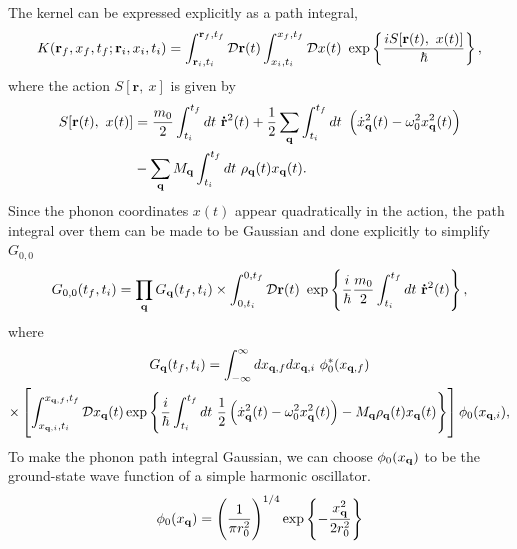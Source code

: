 The kernel can be expressed explicitly as a path integral,
\begin{equation}
    K(\vb{r}_f, x_f, t_f; \vb{r}_i, x_i, t_i) = \int_{\vb{r}_i, t_i}^{\vb{r}_f, t_f} \mathcal{D} \vb{r}(t) \int_{x_i, t_i}^{x_f, t_f} \mathcal{D}x(t)\ \exp\left\{{\frac{iS[\vb{r}(t),\ x(t)]}{\hbar}}\right\},
\label{eqn-2211-1}
\end{equation}
where the action $S[\mathbf{r},\ x]$ is given by
\begin{equation}
\begin{aligned}
    S[\mathbf{r}(t),\ x(t)] &= \frac{m_0}{2} \int_{t_i}^{t_f} dt\ \vb{\dot{r}}^2(t) + \frac{1}{2} \sum_{\vb{q}} \int_{t_i}^{t_f} dt\ \left( \dot{x}_{\vb{q}}^2(t) - \omega_0^2 x_{\vb{q}}^2(t) \right) \\
    &- \sum_{\vb{q}} M_{\vb{q}} \int_{t_i}^{t_f} dt\ \rho_{\vb{q}}(t) x_{\vb{q}}(t). 
\label{eqn-2211-2}
\end{aligned}
\end{equation}
Since the phonon coordinates $x(t)$ appear quadratically in the action, the path integral over them can be made to be Gaussian and done explicitly to simplify $G_{0,0}$
\begin{equation}
    G_{0,0}(t_f, t_i) = \prod_{\vb{q}} G_{\vb{q}}(t_f, t_i) \times \int^{0, t_f}_{0, t_i} \mathcal{D}\vb{r}(t)\ \exp\left\{ \frac{i}{\hbar}  \frac{m_0}{2} \int^{t_f}_{t_i} dt\ \vb{\dot{r}}^2(t)  \right\},
\label{eqn-2211-3}
\end{equation}
where
\begin{equation}
\begin{gathered}
    G_{\vb{q}}(t_f, t_i) = \int_{-\infty}^{\infty} dx_{\vb{q}, f} dx_{\vb{q}, i}\ \phi_0^*(x_{\vb{q}, f}) \\
    \times \left[\int^{x_{\vb{q},f}, t_f}_{x_{\vb{q}, i}, t_i} \mathcal{D}x_{\vb{q}}(t) \exp \left\{\frac{i}{\hbar} \int_{t_i}^{t_f} dt\  \frac{1}{2}\left(\dot{x}_{\vb{q}}^2(t) - \omega_0^2 x_{\vb{q}}^2(t) \right) - M_{\vb{q}} \rho_{\vb{q}}(t) x_{\vb{q}}(t) \right\} \right] \phi_0(x_{\vb{q}, i}),
\end{gathered}
\label{eqn-2211-4}
\end{equation}
To make the phonon path integral Gaussian, we can choose $\phi_0(x_{\vb{q}})$ to be the ground-state wave function of a simple harmonic oscillator.
\begin{equation}
    \phi_0(x_{\vb{q}}) = \left(\frac{1}{\pi r_0^2}\right)^{1/4} \exp \left\{-\frac{x_{\vb{q}}^2}{2 r_0^2} \right\}
\label{eqn-2211-6}
\end{equation}
